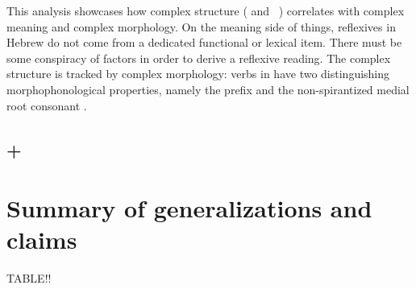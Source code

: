 {{%

\vspace{2em}

This analysis showcases how complex structure ({\vz} and {\va}~\!) correlates with complex meaning and complex morphology. On the meaning side of things, reflexives in Hebrew do not come from a dedicated functional or lexical item. There must be some conspiracy of factors in order to derive a reflexive reading. The complex structure is tracked by complex morphology: verbs in {\thit} have two distinguishing morphophonological properties, namely the prefix and the non-spirantized medial root consonant .



	\subsection{{\pz} + \va} \label{vz:va:pzva}

				
\section{Summary of generalizations and claims} \label{vz:sum}

TABLE!!


}}
